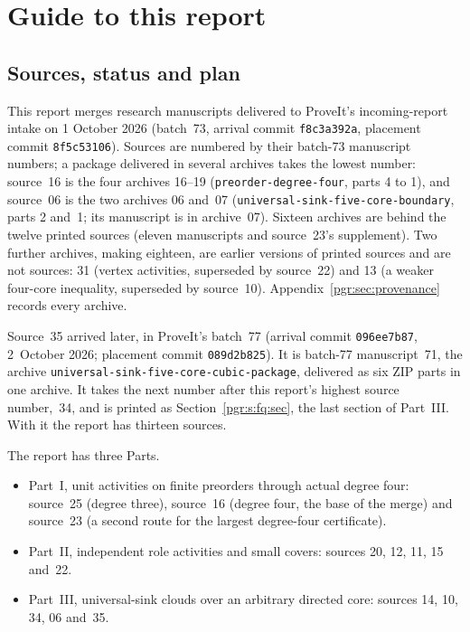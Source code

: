 \documentclass[11pt]{article}
\numberwithin{equation}{section}
\theoremstyle{definition}\newtheorem{definition}[theorem]{Definition}\newtheorem{remark}[theorem]{Remark}
\begin{document}
\section{Guide to this report}\label{pgr:sec:guide}

\subsection{Sources, status and plan}\label{pgr:sec:scope}
This report merges research manuscripts delivered to ProveIt's
incoming-report intake on 1 October 2026 (batch~73, arrival commit
\texttt{f8c3a392a}, placement commit \texttt{8f5c53106}). Sources are
numbered by their batch-73 manuscript numbers; a package delivered in
several archives takes the lowest number: source~16 is the four archives
16--19 (\texttt{preorder-degree-four}, parts 4 to 1), and source~06 is the
two archives 06 and~07 (\texttt{universal-sink-five-core-boundary}, parts 2
and~1; its manuscript is in archive~07). Sixteen archives are behind the %
twelve printed sources (eleven manuscripts and source~23's supplement). Two
further archives, making eighteen, are earlier versions of
printed sources and are not sources: 31 (vertex activities, superseded by
source~22) and 13 (a weaker four-core inequality, superseded by source~10).
Appendix~\ref{pgr:sec:provenance} records every archive.

Source~35 arrived later, in ProveIt's batch~77 (arrival commit %
\texttt{096ee7b87}, 2~October 2026; placement commit \texttt{089d2b825}).
It is batch-77 manuscript~71, the archive
\nolinkurl{universal-sink-five-core-cubic-package}, delivered as six ZIP parts
in one archive. It takes the next number after this report's highest
source number,~34, and is printed as Section~\ref{pgr:s:fq:sec}, the last
section of Part~III. With it the report has thirteen sources.

The report has three Parts.
\begin{itemize}
\item Part~I, unit activities on finite preorders through actual degree
  four: source~25 (degree three), source~16 (degree four, the base of the
  merge) and source~23 (a second route for the largest degree-four
  certificate).
\item Part~II, independent role activities and small covers: sources 20,
  12, 11, 15 and~22.
\item Part~III, universal-sink clouds over an arbitrary directed core:
  sources 14, 10, 34, 06 and~35.
\end{itemize}
\end{document}
